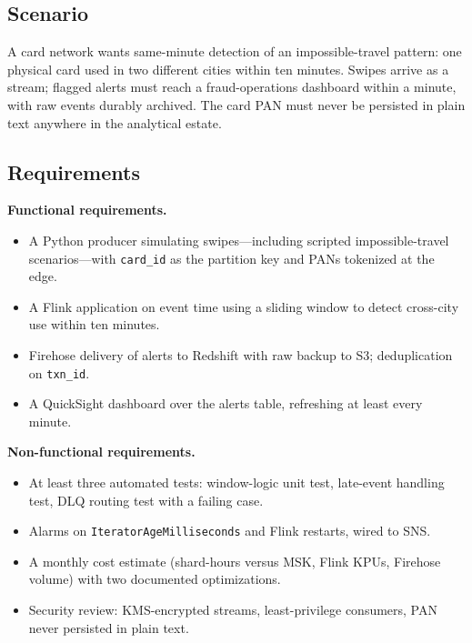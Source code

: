 \subsection*{Scenario}
A card network wants same-minute detection of an impossible-travel pattern: one physical card used in two different cities within ten minutes. Swipes arrive as a stream; flagged alerts must reach a fraud-operations dashboard within a minute, with raw events durably archived. The card PAN must never be persisted in plain text anywhere in the analytical estate.

\subsection*{Requirements}
\textbf{Functional requirements.}
\begin{itemize}
    \item A Python producer simulating swipes---including scripted impossible-travel scenarios---with \texttt{card\_id} as the partition key and PANs tokenized at the edge.
    \item A Flink application on event time using a sliding window to detect cross-city use within ten minutes.
    \item Firehose delivery of alerts to Redshift with raw backup to S3; deduplication on \texttt{txn\_id}.
    \item A QuickSight dashboard over the alerts table, refreshing at least every minute.
\end{itemize}

\textbf{Non-functional requirements.}
\begin{itemize}
    \item At least three automated tests: window-logic unit test, late-event handling test, DLQ routing test with a failing case.
    \item Alarms on \texttt{IteratorAgeMilliseconds} and Flink restarts, wired to SNS.
    \item A monthly cost estimate (shard-hours versus MSK, Flink KPUs, Firehose volume) with two documented optimizations.
    \item Security review: KMS-encrypted streams, least-privilege consumers, PAN never persisted in plain text.
\end{itemize}

